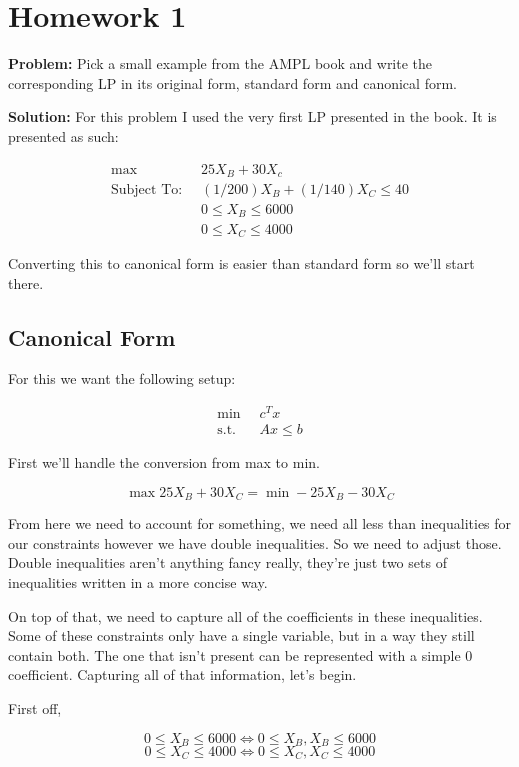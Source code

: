 \section*{Homework 1}

\textbf{Problem:} Pick a small example from the AMPL book and write the corresponding LP in its original form, standard form and canonical form.

\textbf{Solution:} For this problem I used the very first LP presented in the book. It is presented as such:

\begin{align*}
	\max \;\; & 25 X_B + 30X_c \\
	\text{Subject To:}\;\;  & (1/200) X_B + (1/140) X_C \leq 40 \\
	& 0 \leq X_B \leq 6000 \\
	& 0 \leq X_C \leq 4000
\end{align*}

Converting this to canonical form is easier than standard form so we'll start there.

\subsection*{Canonical Form}

For this we want the following setup:

\begin{align*}
	\min \;\; & c^T x \\
	\text{s.t.} \;\; & Ax \leq b
\end{align*}

First we'll handle the conversion from max to min.

\[\max 25 X_B + 30 X_C = \min -25 X_B - 30X_C\]

From here we need to account for something, we need all less than inequalities for our constraints however we have double inequalities. So we need to adjust those. Double inequalities aren't anything fancy really, they're just two sets of inequalities written in a more concise way.

On top of that, we need to capture all of the coefficients in these inequalities. Some of these constraints only have a single variable, but in a way they still contain both. The one that isn't present can be represented with a simple 0 coefficient. Capturing all of that information, let's begin.

First off,

\[0 \leq X_B \leq 6000 \iff 0 \leq X_B, X_B \leq 6000\]
\[0 \leq X_C \leq 4000 \iff 0 \leq X_C, X_C \leq 4000\]

